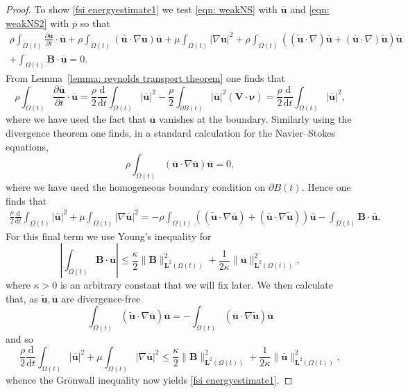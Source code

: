\documentclass[a4paper]{amsart}
\numberwithin{equation}{section}
\newcommand{\ddt}[1]{\frac{\partial #1}{\partial t}}
\newcommand{\grad}{\nabla}
\theoremstyle{plain}
\newcommand{\mbf}[1]{\mathbf{#1}}
\begin{document}
\begin{proof}
	To show \eqref{fsi energyestimate1} we test \eqref{eqn: weakNS} with $\overline{\mbf{u}}$ and \eqref{eqn: weakNS2} with $\overline{p}$ so that
    \begin{multline*}
        \rho \int_{\Omega(t)} \ddt{\overline{\mbf{u}}} \cdot \overline{\mbf{u}} + \rho \int_{\Omega(t)} \left(\overline{\mbf{u}}\cdot \grad \overline{\mbf{u}}\right) \overline{\mbf{u}} + \mu \int_{\Omega(t)} |\grad \overline{\mbf{u}}|^2 + \rho \int_{\Omega(t)} \left((\widetilde{\mbf{u}} \cdot \grad) \overline{\mbf{u}} + (\overline{\mbf{u}} \cdot \grad)\widetilde{\mbf{u}} \right)\overline{\mbf{u}}\\
        + \int_{\Omega(t)} \mbf{B} \cdot \overline{\mbf{u}} = 0.
    \end{multline*}
	From Lemma~\ref{lemma: reynolds transport theorem} one finds that
	\[ \rho \int_{\Omega(t)} \ddt{\overline{\mbf{u}}} \cdot \overline{\mbf{u}} = \frac{\rho}{2} \frac{\mathrm{d}}{\mathrm{d}t} \int_{\Omega(t)} |\overline{\mbf{u}}|^2 - \frac{\rho}{2} \int_{\partial B(t)} |\overline{\mbf{u}}|^2 (\mbf{V} \cdot \boldsymbol{\nu}) = \frac{\rho}{2} \frac{\mathrm{d}}{\mathrm{d}t} \int_{\Omega(t)} |\overline{\mbf{u}}|^2, \]
    where we have used the fact that $\overline{\mbf{u}}$ vanishes at the boundary.
    Similarly using the divergence theorem one finds, in a standard calculation for the Navier--Stokes equations,
	\[ \rho \int_{\Omega(t)} \left(\overline{\mbf{u}} \cdot \grad \overline{\mbf{u}}\right) \overline{\mbf{u}} = 0,\]
	where we have used the homogeneous boundary condition on $\partial B(t)$.
	Hence one finds that
	\begin{align*}
		\frac{\rho}{2} \frac{\mathrm{d}}{\mathrm{d}t} \int_{\Omega(t)} |\overline{\mbf{u}}|^2 + \mu \int_{\Omega(t)} |\grad \overline{\mbf{u}}|^2 = - \rho \int_{\Omega(t)} \left((\widetilde{\mbf{u}} \cdot \grad \overline{\mbf{u}}) + (\overline{\mbf{u}} \cdot \grad\widetilde{\mbf{u}}) \right)\overline{\mbf{u}} -  \int_{\Omega(t)} \mbf{B} \cdot \overline{\mbf{u}}.
	\end{align*}
    For this final term we use Young's inequality for
    \[ \left| \int_{\Omega(t)} \mbf{B} \cdot \overline{\mbf{u}} \right| \leq \frac{\kappa}{2}\| \mbf{B}\|_{\mbf{L}^2(\Omega(t))}^2 + \frac{1}{2\kappa}\| \overline{\mbf{u}}\|_{\mbf{L}^2(\Omega(t))}^2,\]
    where $\kappa > 0$ is an arbitrary constant that we will fix later.
        We then calculate that, as $\widetilde{\mbf{u}}, \overline{\mbf{u}}$ are divergence-free
        \[ \int_{\Omega(t)} (\widetilde{\mbf{u}} \cdot \grad \overline{\mbf{u}})\overline{\mbf{u}} = - \int_{\Omega(t)} (\overline{\mbf{u}} \cdot \grad\widetilde{\mbf{u}})\overline{\mbf{u}} \]
	and so
        \[\frac{\rho}{2} \frac{\mathrm{d}}{\mathrm{d}t} \int_{\Omega(t)} |\overline{\mbf{u}}|^2 + \mu \int_{\Omega(t)} |\grad \overline{\mbf{u}}|^2 \leq \frac{\kappa}{2}\| \mbf{B}\|_{\mbf{L}^2(\Omega(t))}^2 + \frac{1}{2\kappa}\| \overline{\mbf{u}}\|_{\mbf{L}^2(\Omega(t))}^2,\]
        whence the Gr\"onwall inequality now yields \eqref{fsi energyestimate1}.
	

\end{proof}
\end{document}

